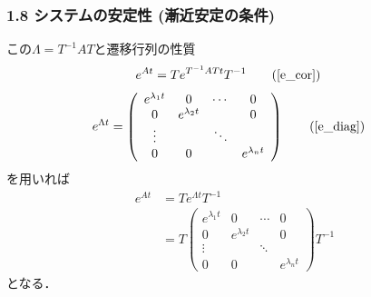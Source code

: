 \begin{frame}[t]
\frametitle{1.8 システムの安定性 (漸近安定の条件)}
この$\Lambda = T^{-1} A T$と遷移行列の性質
\begin{align}
 e^{At}           &= T e^{T^{-1}AT t} T^{-1}
 \tag{\ref{e_cor}}
\end{align}
\begin{align}
 e^{\Lambda t}
 &=
 \left(\begin{array}{cccc}
        e^{\lambda_1 t} & 0               & \cdots & 0 \\
  0               & e^{\lambda_2 t} &        & 0 \\
  \vdots          &                 & \ddots & \\
  0               & 0               &        & e^{\lambda_n t}
       \end{array}\right)
 \tag{\ref{e_diag}}
\end{align}
を用いれば
\begin{align}
 e^{At}
  &= T e^{\Lambda t} T^{-1} \nonumber \\
 &= T
  \left(\begin{array}{cccc}
         e^{\lambda_1 t} & 0               & \cdots & 0 \\
   0               & e^{\lambda_2 t} &        & 0 \\
   \vdots          &                 & \ddots &   \\
   0               & 0               &        & e^{\lambda_n t}
  \end{array}\right)
  T^{-1}
\end{align}
となる．
\end{frame}


